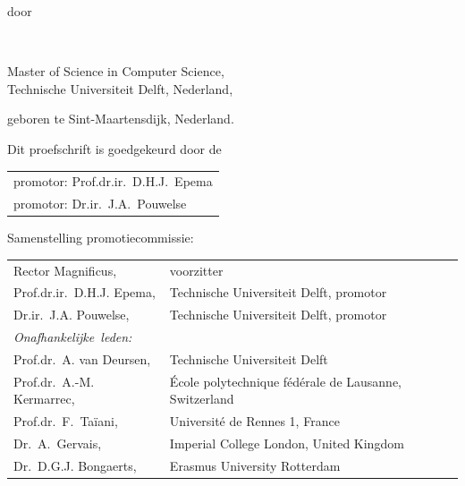 \begin{titlepage}
\begin{center}
\bigskip
\bigskip

door

\bigskip
\bigskip

\makeatletter
{\Large\titlefont\bfseries\@firstname\ \titleshape{\MakeUppercase{\@lastname}}}
\makeatother

\bigskip
\bigskip

Master of Science in Computer Science, \\
Technische Universiteit Delft, Nederland,

geboren te Sint-Maartensdijk, Nederland.

\vspace*{2\bigskipamount}

\end{center}

\clearpage
\thispagestyle{empty}

\noindent Dit proefschrift is goedgekeurd door de

\medskip\noindent
\begin{tabular}{l}
    promotor: Prof.dr.ir.\ D.H.J.\ Epema \\
    promotor: Dr.ir.\ J.A.\ Pouwelse
\end{tabular}

\bigskip
\noindent Samenstelling promotiecommissie:

\medskip\noindent
\begin{tabular}{p{4.5cm}l}
    Rector Magnificus, & voorzitter \\
    Prof.dr.ir.\ D.H.J. Epema, & Technische Universiteit Delft, promotor\\
    Dr.ir.\ J.A. Pouwelse, & Technische Universiteit Delft, promotor\\

    \medskip
    \mbox{\emph{Onafhankelijke leden:}} & \\
    Prof.dr.\ A. van Deursen, & Technische Universiteit Delft \\
    Prof.dr.\ A.-M. Kermarrec, & École polytechnique fédérale de Lausanne, Switzerland \\
    Prof.dr.\ F.\ Taïani, & Université de Rennes 1, France \\
    Dr.\ A.\ Gervais, & Imperial College London, United Kingdom \\
    Dr.\ D.G.J. Bongaerts, & Erasmus University Rotterdam \\
    

\end{tabular}
\end{titlepage}
